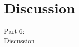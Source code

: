 \section{Discussion}
\begin{frame}[fragile]
  \vspace{25mm}
  \begin{center}
    \Huge{Part 6:\\Discussion}
  \end{center}
\end{frame}
